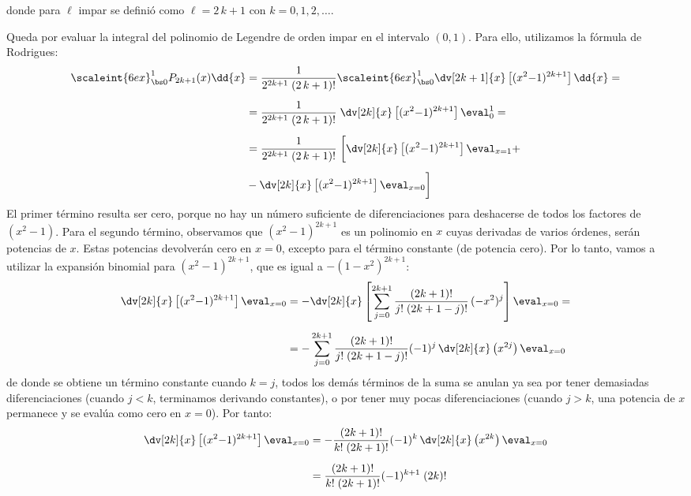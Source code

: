 donde para $\ell$ impar se definió como $\ell = 2 \, k + 1$ con $k = 0, 1, 2, \ldots$.
\par
Queda por evaluar la integral del polinomio de Legendre de orden impar en el intervalo $(0, 1)$. Para ello, utilizamos la fórmula de Rodrigues:
\begin{align*}
\scaleint{6ex}_{\bs 0}^{1} P_{2k+1} (x) \dd{x} &= \dfrac{1}{2^{2k+1} \; (2 \, k +1)!} \scaleint{6ex}_{\bs 0}^{1} \dv[2k+1]{x} \left[ (x^{2} {-} 1)^{2k+1} \right] \dd{x} = \\[0.5em]
&= \dfrac{1}{2^{2k+1} \; (2 \, k +1)!} \; \dv[2k]{x} \left[ (x^{2} {-} 1)^{2k+1} \right] \eval_{0}^{1} = \\[0.5em]
&= \dfrac{1}{2^{2k+1} \; (2 \, k +1)!} \; \bigg[ \dv[2k]{x} \left[ (x^{2} {-} 1)^{2k+1} \right] \eval_{x=1} + \\[0.5em]
&- \dv[2k]{x} \left[ (x^{2} {-} 1)^{2k+1} \right] \eval_{x=0} \bigg]
\end{align*}
El primer término resulta ser cero, porque no hay un número suficiente de diferenciaciones para deshacerse de todos los factores de $(x^{2} - 1)$. Para el segundo término, observamos que $(x^{2} - 1)^{2k + 1}$ es un polinomio en $x$ cuyas derivadas de varios órdenes, serán potencias de $x$. Estas potencias devolverán cero en $x = 0$, excepto para el término constante (de potencia cero). Por lo tanto, vamos a utilizar la expansión binomial para $(x^{2} - 1)^{2k + 1}$, que es igual a $-(1 {-} x^{2})^{2k + 1}$:
\begin{align*}
\dv[2k]{x} \left[ (x^{2} {-} 1)^{2k+1} \right] \eval_{x=0} &= - \dv[2k]{x} \left[ \sum_{j=0}^{2k+1} \dfrac{(2k+1)!}{j! \; (2k + 1 - j)!} \, (-x^{2})^{j} \right] \eval_{x=0} = \\[0.5em]
&= - \sum_{j=0}^{2k+1} \dfrac{(2k+1)!}{j! \; (2k + 1 - j)!} (-1)^{j} \, \dv[2k]{x} \left( x^{2j} \right) \eval_{x=0}
\end{align*}
de donde se obtiene un término constante cuando $k = j$, todos los demás términos de la suma se anulan ya sea por tener  demasiadas diferenciaciones (cuando $j < k$, terminamos derivando constantes), o por tener muy pocas diferenciaciones (cuando $j > k$, una potencia de $x$ permanece y se evalúa como cero en $x = 0$). Por tanto:
\begin{align*}
\dv[2k]{x} \left[ (x^{2} {-} 1)^{2k+1} \right] \eval_{x=0} &= - \dfrac{(2k+1)!}{k! \; (2k + 1)!} (-1)^{k} \, \dv[2k]{x} \left( x^{2k} \right) \eval_{x=0} \\[0.5em]
&= \dfrac{(2k+1)!}{k! \; (2k + 1)!} (-1)^{k+1} \; (2k)!
\end{align*}
